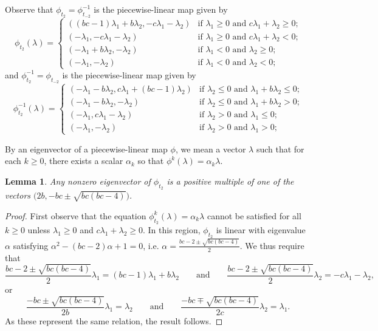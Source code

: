 \documentclass{amsart}
\newtheorem{lemma}[theorem]{Lemma}
\numberwithin{theorem}{section}
\begin{document}
  Observe that $\phi_{t_2}=\phi_{t_{-2}}^{-1}$ is the piecewise-linear map given by
  \begin{equation}
    \label{eq:forward two step mutation}
    \phi_{t_2}(\lambda)=\begin{cases} ((bc-1)\lambda_1+b\lambda_2, -c\lambda_1-\lambda_2) & \text{if $\lambda_1\ge 0$ and $c\lambda_1+\lambda_2\ge 0$;}\\ (-\lambda_1, -c\lambda_1-\lambda_2) & \text{if $\lambda_1\ge 0$ and $c\lambda_1+\lambda_2<0$;}\\ (-\lambda_1+b\lambda_2, -\lambda_2) & \text{if $\lambda_1<0$ and $\lambda_2\ge 0$;}\\ (-\lambda_1,-\lambda_2) & \text{if $\lambda_1<0$ and $\lambda_2<0$;}\end{cases}
  \end{equation}
  and $\phi_{t_2}^{-1}=\phi_{t_{-2}}$ is the piecewise-linear map given by
  \begin{equation}
    \label{eq:backward two step mutation}
    \phi_{t_2}^{-1}(\lambda)=\begin{cases} (-\lambda_1-b\lambda_2, c\lambda_1+(bc-1)\lambda_2) & \text{if $\lambda_2\le 0$ and $\lambda_1+b\lambda_2\le 0$;}\\ (-\lambda_1-b\lambda_2, -\lambda_2) & \text{if $\lambda_2\le 0$ and $\lambda_1+b\lambda_2>0$;}\\ (-\lambda_1, c\lambda_1-\lambda_2) & \text{if $\lambda_2>0$ and $\lambda_1\le 0$;}\\ (-\lambda_1,-\lambda_2) & \text{if $\lambda_2>0$ and $\lambda_1>0$;}\end{cases}
  \end{equation}

  By an eigenvector of a piecewise-linear map $\phi$, we mean a vector $\lambda$ such that for each $k\ge0$, there exists a scalar $\alpha_k$ so that $\phi^k(\lambda)=\alpha_k\lambda$.
  \begin{lemma}
    Any nonzero eigenvector of $\phi_{t_2}$ is a positive multiple of one of the vectors $\big(2b,-bc\pm\sqrt{bc(bc-4)}\big)$.
  \end{lemma}
  \begin{proof}
    First observe that the equation $\phi_{t_2}^k(\lambda)=\alpha_k\lambda$ cannot be satisfied for all $k\ge0$ unless $\lambda_1\ge 0$ and $c\lambda_1+\lambda_2\ge 0$.
    In this region, $\phi_{t_2}$ is linear with eigenvalue $\alpha$ satisfying $\alpha^2-(bc-2)\alpha+1=0$, i.e. $\alpha=\frac{bc-2\pm\sqrt{bc(bc-4)}}{2}$.
    We thus require that 
    \[\frac{bc-2\pm\sqrt{bc(bc-4)}}{2}\lambda_1=(bc-1)\lambda_1+b\lambda_2 \qquad\text{and}\qquad \frac{bc-2\pm\sqrt{bc(bc-4)}}{2}\lambda_2= -c\lambda_1-\lambda_2,\]
    or
    \[\frac{-bc\pm\sqrt{bc(bc-4)}}{2b}\lambda_1=\lambda_2 \qquad\text{and}\qquad \frac{-bc\mp\sqrt{bc(bc-4)}}{2c}\lambda_2=\lambda_1.\]
    As these represent the same relation, the result follows.
  \end{proof}
\end{document}
